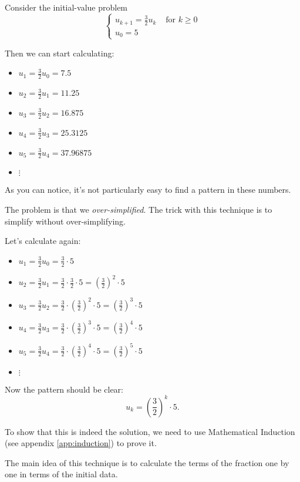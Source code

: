 \begin{example}
Consider the initial-value problem
$$
\begin{cases}
u_{k+1} = \frac32 u_k & \text{ for } k \geq 0 \\
u_0 = 5	
\end{cases}
$$

Then we can start calculating:
\begin{itemize}
	\item $u_1 = \frac32 u_0 = 7.5$
	\item $u_2 = \frac32 u_1 = 11.25$
	\item $u_3 = \frac32 u_2 = 16.875$
	\item $u_4 = \frac32 u_3 = 25.3125$
	\item $u_5 = \frac32 u_4 = 37.96875$
	\item $\vdots$
\end{itemize}

As you can notice, it's not particularly easy to find a pattern in these numbers. 

The problem is that we \emph{over-simplified}. The trick with this technique is to simplify without over-simplifying.

Let's calculate again:
\begin{itemize}
	\item $u_1 = \frac32 u_0 = \frac32 \cdot 5$
	\item $u_2 = \frac32 u_1 = \frac32 \cdot \frac32 \cdot 5 = \left(\frac32\right)^2 \cdot 5$
	\item $u_3 = \frac32 u_2 = \frac32 \cdot \left(\frac32\right)^2 \cdot 5 = \left(\frac32\right)^3 \cdot 5$
	\item $u_4 = \frac32 u_3 = \frac32 \cdot \left(\frac32\right)^3 \cdot 5 = \left(\frac32\right)^4 \cdot 5$
	\item $u_5 = \frac32 u_4 = \frac32 \cdot \left(\frac32\right)^4 \cdot 5 = \left(\frac32\right)^5 \cdot 5$
	\item $\vdots$
\end{itemize}

Now the pattern should be clear:
$$
u_k = \left(\frac32\right)^k \cdot 5.
$$

To show that this is indeed the solution, we need to use Mathematical Induction (see appendix \ref{app:induction}) to prove it. 
\end{example}

The main idea of this technique is to calculate the terms of the fraction one by one in terms of the initial data.

